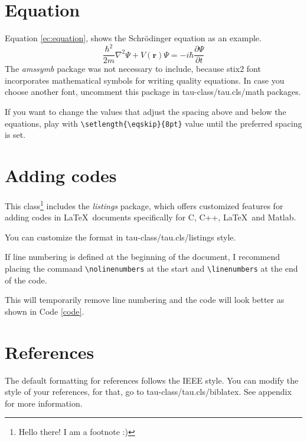 \documentclass[9pt,a4paper,twoside]{tau-class/tau}
\begin{document}
\section{Equation}

    Equation \ref{ec:equation}, shows the Schrödinger equation as an example. 
	\begin{equation} \label{ec:equation}
		\frac{\hbar^2}{2m}\nabla^2\Psi + V(\mathbf{r})\Psi = -i\hbar \frac{\partial\Psi}{\partial t}
	\end{equation} 
    The \textit{amssymb} package was not necessary to include, because stix2 font incorporates mathematical symbols for writing quality equations. In case you choose another font, uncomment this package in tau-class/tau.cls/math packages.
	
    If you want to change the values that adjust the spacing above and below the equations, play with \verb|\setlength{\eqskip}{8pt}| value until the preferred spacing is set.
	
\section{Adding codes}
	
    This class\footnote{Hello there! I am a footnote :)} includes the \textit{listings} package, which offers customized features for adding codes in \LaTeX\ documents specifically for C, C++, \LaTeX\ and Matlab. 
	
    You can customize the format in tau-class/tau.cls/listings style.
	
        \nolinenumbers
            
	\linenumbers
	
    If line numbering is defined at the beginning of the document, I recommend placing the command \verb|\nolinenumbers| at the start and \verb|\linenumbers| at the end of the code. 
	
    This will temporarily remove line numbering and the code will look better as shown in Code \ref{code}.
	
\section{References}

    The default formatting for references follows the IEEE style. You can modify the style of your references, for that, go to tau-class/tau.cls/biblatex. See appendix for more information.
	
\end{document}
